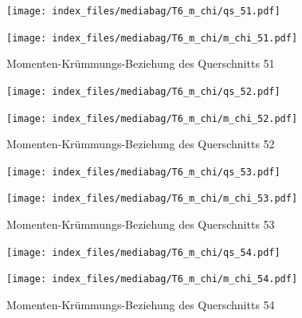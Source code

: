 \documentclass[
  11pt,
  letterpaper,
]{scrreprt}
\begin{document}
\begin{figure}[H]

\begin{minipage}{0.50\linewidth}
\texttt{[image: index\_files/mediabag/T6\_m\_chi/qs\_51.pdf]}\end{minipage}%
%
\begin{minipage}{0.50\linewidth}
\texttt{[image: index\_files/mediabag/T6\_m\_chi/m\_chi\_51.pdf]}\end{minipage}%

\caption{\label{fig-m_chi_appendix}Momenten-Krümmungs-Beziehung des
Querschnitts 51}

\end{figure}%

\begin{figure}[H]

\begin{minipage}{0.50\linewidth}
\texttt{[image: index\_files/mediabag/T6\_m\_chi/qs\_52.pdf]}\end{minipage}%
%
\begin{minipage}{0.50\linewidth}
\texttt{[image: index\_files/mediabag/T6\_m\_chi/m\_chi\_52.pdf]}\end{minipage}%

\caption{\label{fig-m_chi_appendix}Momenten-Krümmungs-Beziehung des
Querschnitts 52}

\end{figure}%

\begin{figure}[H]

\begin{minipage}{0.50\linewidth}
\texttt{[image: index\_files/mediabag/T6\_m\_chi/qs\_53.pdf]}\end{minipage}%
%
\begin{minipage}{0.50\linewidth}
\texttt{[image: index\_files/mediabag/T6\_m\_chi/m\_chi\_53.pdf]}\end{minipage}%

\caption{\label{fig-m_chi_appendix}Momenten-Krümmungs-Beziehung des
Querschnitts 53}

\end{figure}%

\begin{figure}[H]

\begin{minipage}{0.50\linewidth}
\texttt{[image: index\_files/mediabag/T6\_m\_chi/qs\_54.pdf]}\end{minipage}%
%
\begin{minipage}{0.50\linewidth}
\texttt{[image: index\_files/mediabag/T6\_m\_chi/m\_chi\_54.pdf]}\end{minipage}%

\caption{\label{fig-m_chi_appendix}Momenten-Krümmungs-Beziehung des
Querschnitts 54}

\end{figure}%
\end{document}

